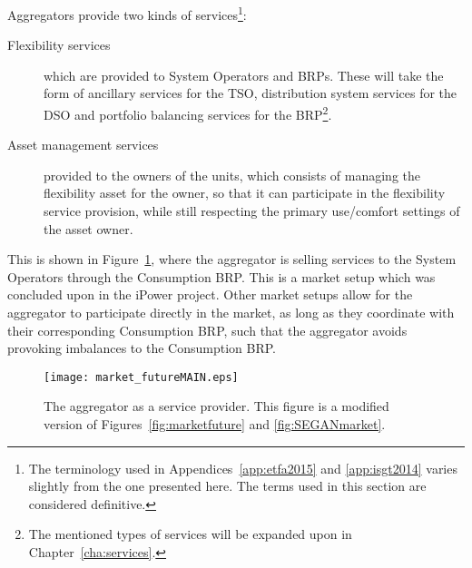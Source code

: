 Aggregators provide two kinds of services\footnote{The terminology used in Appendices~\ref{app:etfa2015} and \ref{app:isgt2014} varies slightly from the one presented here. The terms used in this section are considered definitive.}:
\begin{description}
	\item[Flexibility services] which are provided to System Operators and BRPs. These will take the form of ancillary services for the TSO, distribution system services for the DSO and portfolio balancing services for the BRP\footnote{The mentioned types of services will be expanded upon in Chapter~\ref{cha:services}.}.
	\item[Asset management services] provided to the owners of the units, which consists of managing the flexibility asset for the owner, so that it can participate in the flexibility service provision, while still respecting the primary use/comfort settings of the asset owner.
\end{description}
This is shown in Figure~\ref{fig:market_futureMAIN}, where the aggregator is selling services to the System Operators through the Consumption BRP. This is a market setup which was concluded upon in the iPower project. Other market setups allow for the aggregator to participate directly in the market, as long as they coordinate with their corresponding Consumption BRP, such that the aggregator avoids provoking imbalances to the Consumption BRP.
\begin{figure}[htbp!]
\centering
\texttt{[image: market\_futureMAIN.eps]}
\caption{The aggregator as a service provider. This figure is a modified version of Figures~\ref{fig:marketfuture} and \ref{fig:SEGANmarket}.}
\label{fig:market_futureMAIN}
\end{figure}

